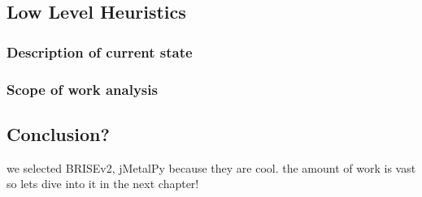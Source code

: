 \subsection{Low Level Heuristics}
\subsubsection{Description of current state}
\subsubsection{Scope of work analysis}

\subsection{Conclusion?}
we selected BRISEv2, jMetalPy because they are cool.
the amount of work is vast so lets dive into it in the next chapter!
